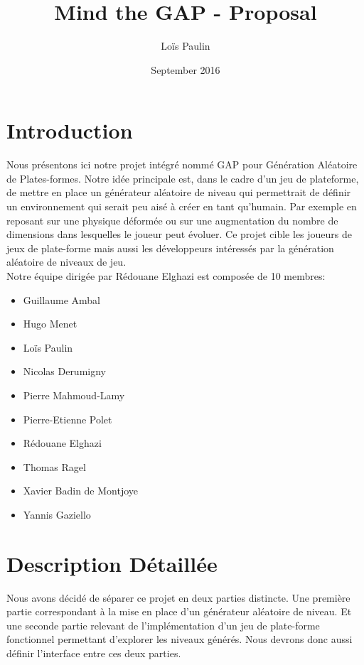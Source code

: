 \documentclass[12pt]{article}
\title{Mind the GAP - Proposal}
\author{Loïs Paulin}
\date{September 2016}
\begin{document}
\maketitle

\section{Introduction}
    Nous présentons ici notre projet intégré nommé GAP pour Génération Aléatoire de Plates-formes. Notre idée principale est, dans le cadre d'un jeu de plateforme, de mettre en place un générateur aléatoire de niveau qui permettrait de définir un environnement qui serait peu aisé à créer en tant qu'humain. Par exemple en reposant sur une physique déformée ou sur une augmentation du nombre de dimensions dans lesquelles le joueur peut évoluer. Ce projet cible les joueurs de jeux de plate-forme mais aussi les développeurs intéressés par la génération aléatoire de niveaux de jeu. \\
    Notre équipe dirigée par Rédouane Elghazi est composée de 10 membres:
    \begin{itemize}
        \renewcommand{\labelitemi}{$\bullet$}
        \item Guillaume Ambal
        \item Hugo Menet
        \item Loïs Paulin
        \item Nicolas Derumigny
        \item Pierre Mahmoud-Lamy
        \item Pierre-Etienne Polet
        \item Rédouane Elghazi
        \item Thomas Ragel
        \item Xavier Badin de Montjoye
        \item Yannis Gaziello
    \end{itemize}
    
\clearpage
\section{Description Détaillée}

    Nous avons décidé de séparer ce projet en deux parties distincte. Une première partie correspondant à la mise en place d'un générateur aléatoire de niveau. Et une seconde partie relevant de l'implémentation d'un jeu de plate-forme fonctionnel permettant d'explorer les niveaux générés. Nous devrons donc aussi définir l'interface entre ces deux parties.
    
\end{document}
